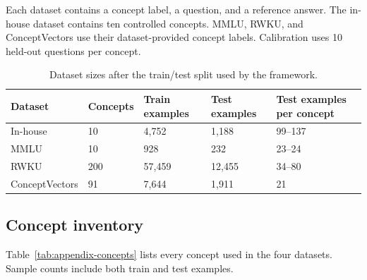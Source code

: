 \documentclass{article}
\begin{document}
Each dataset contains a concept label, a question, and a reference answer. The
in-house dataset contains ten controlled concepts. MMLU, RWKU, and
ConceptVectors use their dataset-provided concept labels. Calibration uses 10
held-out questions per concept.

\begin{table}[h]
\centering
\small
\begin{tabular}{lllll}
\hline
Dataset & Concepts & Train examples & Test examples & Test examples per concept \\
\hline
In-house & 10 & 4{,}752 & 1{,}188 & 99--137 \\
MMLU & 10 & 928 & 232 & 23--24 \\
RWKU & 200 & 57{,}459 & 12{,}455 & 34--80 \\
ConceptVectors & 91 & 7{,}644 & 1{,}911 & 21 \\
\hline
\end{tabular}
\caption{Dataset sizes after the train/test split used by the framework.}
\label{tab:appendix-datasets}
\end{table}

\subsection{Concept inventory}

Table~\ref{tab:appendix-concepts} lists every concept used in the four
datasets. Sample counts include both train and test examples.
\end{document}
